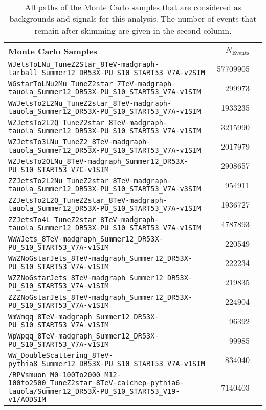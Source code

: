 \begin{sidewaystable}[ht!]
  \centering
  \begin{tabular}{|l|r|r|}
    \hline
    Monte Carlo Samples & $N_{\text{Events}}$ \\
    \hline
    \hline
    \verb+WJetsToLNu_TuneZ2Star_8TeV-madgraph-tarball_Summer12_DR53X-PU_S10_START53_V7A-v2SIM+ & 57709905 \\
    \hline
    \verb+WGstarToLNu2Mu_TuneZ2star_7TeV-madgraph-tauola_Summer12_DR53X-PU_S10_START53_V7A-v1SIM+ & 299973 \\
    \verb+WWJetsTo2L2Nu_TuneZ2star_8TeV-madgraph-tauola_Summer12_DR53X-PU_S10_START53_V7A-v1SIM+ & 1933235 \\
    \verb+WZJetsTo2L2Q_TuneZ2star_8TeV-madgraph-tauola_Summer12_DR53X-PU_S10_START53_V7A-v1SIM+ & 3215990 \\
    \verb+WZJetsTo3LNu_TuneZ2_8TeV-madgraph-tauola_Summer12_DR53X-PU_S10_START53_V7A-v1SIM+ & 2017979 \\
    \verb+WZJetsTo2QLNu_8TeV-madgraph_Summer12_DR53X-PU_S10_START53_V7C-v1SIM+ & 2908657 \\
    \verb+ZZJetsTo2L2Nu_TuneZ2star_8TeV-madgraph-tauola_Summer12_DR53X-PU_S10_START53_V7A-v3SIM+ & 954911 \\
    \verb+ZZJetsTo2L2Q_TuneZ2star_8TeV-madgraph-tauola_Summer12_DR53X-PU_S10_START53_V7A-v1SIM+ & 1936727 \\
    \verb+ZZJetsTo4L_TuneZ2star_8TeV-madgraph-tauola_Summer12_DR53X-PU_S10_START53_V7A-v1SIM+ & 4787893 \\
    \hline
    \verb+WWWJets_8TeV-madgraph_Summer12_DR53X-PU_S10_START53_V7A-v1SIM+ & 220549 \\
    \verb+WWZNoGstarJets_8TeV-madgraph_Summer12_DR53X-PU_S10_START53_V7A-v1SIM+ & 222234 \\
    \verb+WZZNoGstarJets_8TeV-madgraph_Summer12_DR53X-PU_S10_START53_V7A-v1SIM+ & 219835 \\
    \verb+ZZZNoGstarJets_8TeV-madgraph_Summer12_DR53X-PU_S10_START53_V7A-v1SIM+ & 224904 \\
    \hline
    \verb+WmWmqq_8TeV-madgraph_Summer12_DR53X-PU_S10_START53_V7A-v1SIM+ & 96392 \\
    \verb+WpWpqq_8TeV-madgraph_Summer12_DR53X-PU_S10_START53_V7A-v1SIM+ & 99985 \\
    \verb+WW_DoubleScattering_8TeV-pythia8_Summer12_DR53X-PU_S10_START53_V7A-v1SIM+ & 834040 \\
    \hline
    \hline
    {\footnotesize\verb+/RPVsmuon_M0-100To2000_M12-100to2500_TuneZ2star_8TeV-calchep-pythia6-tauola/Summer12_DR53X-PU_S10_START53_V19-v1/AODSIM+} & 7140403 \\
    \hline
  \end{tabular}
  \caption{All paths of the Monte Carlo samples that are considered as backgrounds and signals for this analysis. The number of events that remain after skimming are given in the second column.}
  \label{tab:mcsamplepaths}
\end{sidewaystable}


